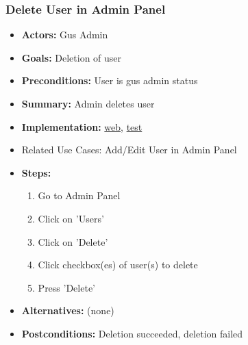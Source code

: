 		\subsubsection{Delete User in Admin Panel}
			\begin{itemize}
				\item{\textbf{Actors:} Gus Admin}
				\item{\textbf{Goals:} Deletion of user}
				\item{\textbf{Preconditions:} User is gus admin status}
				\item{\textbf{Summary:} Admin deletes user} 
				\item{\textbf{Implementation:} 	\href{http://nwerp.org/gus/index.php/users/delete}{web},
								\href{http://nwerp.org/gus/index.php/users/test}{test}
				}
				\item{Related Use Cases: Add/Edit User in Admin Panel}
				\item{\textbf{Steps:}}
				\begin{enumerate}
					\item Go to Admin Panel
					\item Click on 'Users'
					\item Click on 'Delete'
					\item Click checkbox(es) of user(s) to delete
					\item Press 'Delete'
				\end{enumerate}
				\item{\textbf{Alternatives:} (none)}
				\item{\textbf{Postconditions:} Deletion succeeded, deletion failed}
			\end{itemize}

